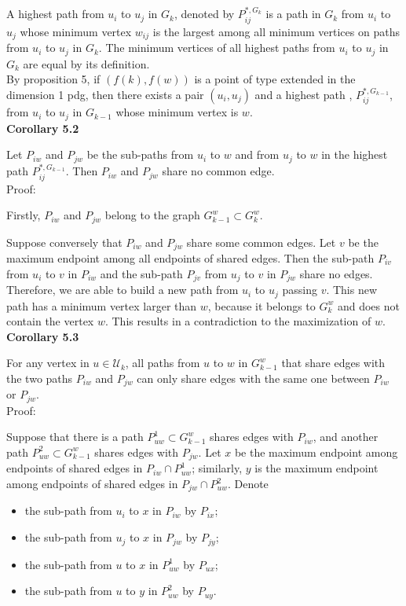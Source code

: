 \documentclass[a4paper,12pt]{article}
\numberwithin{equation}{section}
\begin{document}
	A highest path from $u_i$ to $u_j$ in $G_k$, denoted by $P_{ij}^{*,G_k}$ is a path in $G_k$ from $u_i$ to $u_j$ whose minimum vertex $w_{ij}$ is the largest among all minimum vertices on paths from $u_i$ to $u_j$ in $G_k$. The minimum vertices of all highest paths from $u_i$ to $u_j$ in $G_k$ are equal by its definition.\\
	
	By proposition 5, if $(f(k),f(w))$ is a point of type extended in the dimension 1 pdg, then there exists a pair $(u_i,u_j)$ and a highest path , $P_{ij}^{*,G_{k-1}}$, from $u_i$ to $u_j$ in $G_{k-1}$ whose minimum vertex is $w$.\\			
	
	\noindent \textbf{Corollary 5.2}
	
	Let $P_{iw}$ and $P_{jw}$ be the sub-paths from $u_i$ to $w$ and from $u_j$ to $w$ in the highest path $P_{ij}^{*,G_{k-1}}$. Then $P_{iw}$ and $P_{jw}$ share no common edge.\\
	
	\noindent Proof:
	
	Firstly, $P_{iw}$ and $P_{jw}$ belong to the graph $G_{k-1}^w \subset G_{k}^w$.
	
	Suppose conversely that $P_{iw}$ and $P_{jw}$ share some common edges. Let $v$ be the maximum endpoint among all endpoints of shared edges. Then the sub-path $P_{iv}$ from $u_i$ to $v$ in $P_{iw}$ and the sub-path $P_{jv}$ from $u_j$ to $v$ in $P_{jw}$ share no edges. Therefore, we are able to build a new path from $u_i$ to $u_j$ passing $v$. This new path has a minimum vertex larger than $w$, because it belongs to $G^w_k$ and does not contain the vertex $w$. This results in a contradiction to the maximization of $w$.\\
	
	\noindent \textbf{Corollary 5.3}
	
	For any vertex in $u \in \mathcal{U}_k$, all paths from $u$ to $w$ in $G_{k-1}^w$ that share edges with the two paths $P_{iw}$ and $P_{jw}$ can only share edges with the same one between $P_{iw}$ or $P_{jw}$.\\	
	
	\noindent Proof: 
	
	Suppose that there is a path $P^1_{uw} \subset G_{k-1}^w$ shares edges with $P_{iw}$, and another path $P_{uw}^2 \subset G_{k-1}^w$ shares edges with $P_{jw}$. Let $x$ be the maximum endpoint among endpoints of shared edges in $P_{iw} \cap P^1_{uw}$; similarly, $y$ is the maximum endpoint among endpoints of shared edges in $P_{jw} \cap P^2_{uw}$. Denote 
	\begin{itemize}
		\item the sub-path from $u_i$ to $x$ in $P_{iw}$ by $P_{ix}$;
		\item the sub-path from $u_j$ to $x$ in $P_{jw}$ by $P_{jy}$;
		\item the sub-path from $u$ to $x$ in $P^1_{uw}$ by $P_{ux}$;
		\item the sub-path from $u$ to $y$ in $P^2_{uw}$ by $P_{uy}$.
	\end{itemize}
	
\end{document}
